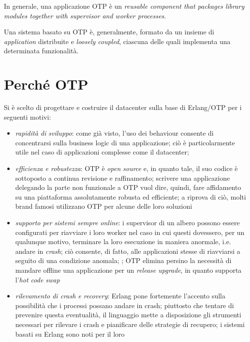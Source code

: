 %
In generale, una applicazione OTP \`e un \emph{reusable component that packages library modules 
together with supervisor and worker processes}\cite{cesarini09}.

%
Una sistema basato su OTP \`e, generalmente, formato da un insieme di \emph{application} distribuite 
e \emph{loosely coupled}, ciascuna delle quali implementa una determinata funzionalit\`a.
%

%
\section{Perch\'e OTP}
%
Si \`e scelto di progettare e costruire il datacenter sulla base di Erlang/OTP per i 
seguenti motivi:
%
\begin{itemize}
\item \emph{rapidit\`a di sviluppo}: come gi\`a visto, l'uso dei behaviour consente 
      di concentrarsi sulla business logic di una applicazione; ci\`o \`e particolarmente 
      utile nel caso di applicazioni complesse come il datacenter; 
%
\item \emph{efficienza e robustezza}: OTP \`e \emph{open source} e, in quanto tale, 
      il suo codice \`e sottoposto a continua revisione e raffinamento; scrivere 
      una applicazione delegando la parte non funzionale a OTP vuol dire, quindi, 
      fare affidamento su una piattaforma assolutamente robusta ed efficiente; 
      a riprova di ci\`o, molti brand famosi utilizzano OTP per alcune delle loro
      soluzioni\cite{whouseserlang}
%
\item \emph{supporto per sistemi sempre online}: i supervisor di un albero possono essere 
      configurati per riavviare i loro worker nel caso in cui questi dovessero, per 
      un qualunque motivo, terminare la loro esecuzione in maniera anormale, i.e. 
      andare in \emph{crash}; ci\`o consente, di fatto, alle applicazioni stesse di
      riavviarsi a seguito di una condizione anomala; ; OTP elimina persino la necessit\`a
      di mandare offline una applicazione per un \emph{release upgrade}, in quanto 
      supporta l'\emph{hot code swap}
%
\item \emph{rilevamento di crash e recovery}: Erlang pone fortemente l'accento sulla 
      possibilit\`a che i processi possano andare in crash; piuttosto che tentare 
      di prevenire questa eventualit\`a, il linguaggio mette a disposizione gli 
      strumenti necessari per  rilevare i crash e  pianificare 
      delle strategie di recupero; i sistemi basati su Erlang sono noti per il loro  

\end{itemize}
